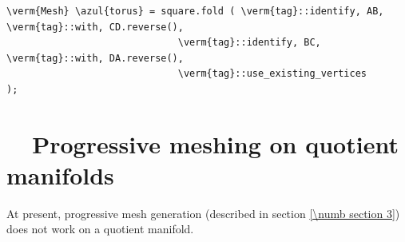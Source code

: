 \begin{Verbatim}[commandchars=\\\{\},formatcom=\small\tt,frame=single,
   label=parag-\ref{\numb section 7.\numb parag 15}.cpp,rulecolor=\color{coment},
   baselinestretch=0.94,framesep=2mm                                             ]
   \verm{Mesh} \azul{torus} = square.fold ( \verm{tag}::identify, AB, \verm{tag}::with, CD.reverse(),
                              \verm{tag}::identify, BC, \verm{tag}::with, DA.reverse(),
                              \verm{tag}::use_existing_vertices                 );
\end{Verbatim}


\section{~~Progressive meshing on quotient manifolds}\label{\numb section 7.\numb parag 16}

At present, progressive mesh generation (described in section \ref{\numb section 3})
does not work on a quotient manifold.


